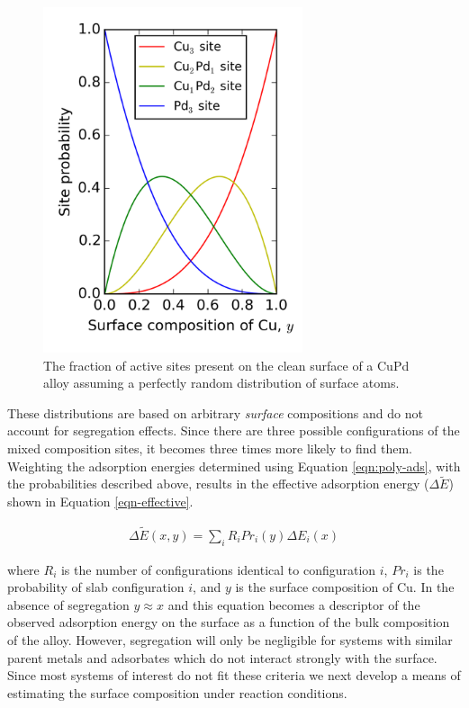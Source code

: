 \documentclass[12pt]{cmuthesis}
\begin{document}
\begin{figure}[h]
\centering
\includegraphics[width=3in]{./images/rndprob.png}
\caption{The fraction of active sites present on the clean surface of a CuPd alloy assuming a perfectly random distribution of surface atoms. \label{fig-rnd}}
\end{figure}

These distributions are based on arbitrary \emph{surface} compositions and do not account for segregation effects. Since there are three possible configurations of the mixed composition sites, it becomes three times more likely to find them. Weighting the adsorption energies determined using Equation \eqref{eqn:poly-ads}, with the probabilities described above, results in the effective adsorption energy (\(\Delta \widetilde{E}\)) shown in Equation \eqref{eqn-effective}.

\begin{eqnarray}
\Delta \widetilde{E}(x,y) = \sum\limits_i R_{i} Pr_{i}(y) \Delta E_{i}(x)
\label{eqn-effective}
\end{eqnarray}

where \(R_{i}\) is the number of configurations identical to configuration \(i\), \(Pr_{i}\) is the probability of slab configuration \(i\), and \(y\) is the surface composition of Cu. In the absence of segregation \(y \approx x\) and this equation becomes a descriptor of the observed adsorption energy on the surface as a function of the bulk composition of the alloy. However, segregation will only be negligible for systems with similar parent metals and adsorbates which do not interact strongly with the surface. Since most systems of interest do not fit these criteria we next develop a means of estimating the surface composition under reaction conditions.
\end{document}
